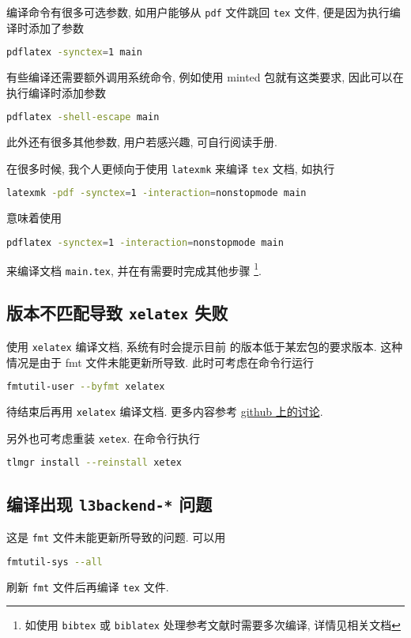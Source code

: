 编译命令有很多可选参数, 如用户能够从 \texttt{pdf} 文件跳回 \texttt{tex} 文件,
便是因为执行编译时添加了参数
\begin{lstlisting}[language=bash]
  pdflatex -synctex=1 main
\end{lstlisting}
有些编译还需要额外调用系统命令,
例如使用 \textsf{minted} 包就有这类要求,
因此可以在执行编译时添加参数
\begin{lstlisting}[language=bash]
  pdflatex -shell-escape main
\end{lstlisting}
此外还有很多其他参数, 用户若感兴趣, 可自行阅读手册. 

在很多时候, 我个人更倾向于使用 \texttt{latexmk} 来编译 \texttt{tex} 文档,
如执行
\begin{lstlisting}[language=bash]
  latexmk -pdf -synctex=1 -interaction=nonstopmode main
\end{lstlisting}
意味着使用 
\begin{lstlisting}[language=bash]
  pdflatex -synctex=1 -interaction=nonstopmode main
\end{lstlisting}
来编译文档 \texttt{main.tex}, 并在有需要时完成其他步骤%
\footnote{如使用 \texttt{bibtex} 或 \texttt{biblatex} 处理参考文献时需要多次编译,
详情见相关文档}. 

\subsection{\LaTeXe 版本不匹配导致 \texttt{xelatex} 失败}

使用 \texttt{xelatex} 编译文档,
系统有时会提示目前 \LaTeXe 的版本低于某宏包的要求版本.
这种情况是由于 \textsf{fmt} 文件未能更新所导致.
此时可考虑在命令行运行
\begin{lstlisting}[language=bash]
  fmtutil-user --byfmt xelatex
\end{lstlisting}
待结束后再用 \texttt{xelatex} 编译文档.
更多内容参考
\href{https://github.com/CTeX-org/forum/issues/70}{github 上的讨论}.

另外也可考虑重装 \texttt{xetex}.
在命令行执行
\begin{lstlisting}[language=bash]
  tlmgr install --reinstall xetex
\end{lstlisting}

\subsection{编译出现 \texttt{l3backend-*} 问题}

这是 \texttt{fmt} 文件未能更新所导致的问题.
可以用
\begin{lstlisting}[language=bash]
  fmtutil-sys --all
\end{lstlisting}
刷新 \texttt{fmt} 文件后再编译 \texttt{tex} 文件.